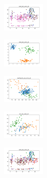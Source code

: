 \begin{figure}[H]
\begin{subfigure}
    \end{subfigure}
    \hfill
    \begin{subfigure}
        \centering
        \includegraphics[width=0.234\textwidth]{img/am01mej/ecoli_set_const_20_589741062_clust.png}
    \end{subfigure}
    \hfill
    \begin{subfigure}
        \centering
        \includegraphics[width=0.234\textwidth]{img/am01mej/rand_set_const_20_589741062_clust.png}
    \end{subfigure}
    \hfill
    \begin{subfigure}
        \centering
        \includegraphics[width=0.234\textwidth]{img/am01mej/newthyroid_set_const_20_589741062_clust.png}
    \end{subfigure}
    \hfill
    \begin{subfigure}
        \centering
        \includegraphics[width=0.234\textwidth]{img/am01mej/iris_set_const_20_277451237_clust.png}
    \end{subfigure}
    \hfill
    \begin{subfigure}
        \centering
        \includegraphics[width=0.234\textwidth]{img/am01mej/ecoli_set_const_20_277451237_clust.png}
    \end{subfigure}

\end{figure}
